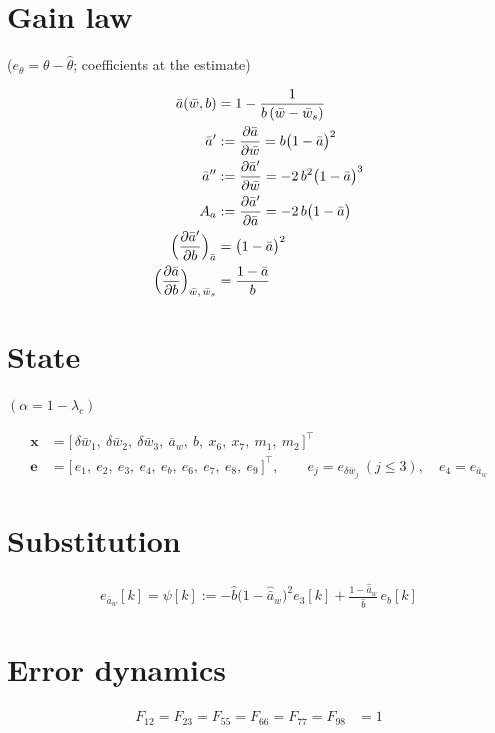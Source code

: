 \documentclass[11pt,a4paper,fontset=none]{ctexart}
\newcommand{\ba}{\bar{a}}
\newcommand{\bw}{\bar{w}}
\newcommand{\ap}{\ba'}
\newcommand{\app}{\ba''}
\newcommand{\ah}{\hat{\ba}_w}
\newcommand{\bh}{\hat{b}}
\newcommand{\ea}{e_{\ba_w}}
\begin{document}
\section{Gain law}

($e_\theta = \theta - \hat\theta$; coefficients at the estimate)

\begin{align*}
\ba(\bw, b) &= 1 - \frac{1}{b\,(\bw - \bw_s)} \\
\ap &:= \frac{\partial\ba}{\partial\bw} = b\bigl(1-\ba\bigr)^{2} \\
\app &:= \frac{\partial\ap}{\partial\bw} = -2\,b^{2}\bigl(1-\ba\bigr)^{3} \\
A_a &:= \frac{\partial\ap}{\partial\ba} = -2\,b\bigl(1-\ba\bigr) \\
\Bigl(\frac{\partial\ap}{\partial b}\Bigr)_{\ba} &= \bigl(1-\ba\bigr)^{2} \\
\Bigl(\frac{\partial\ba}{\partial b}\Bigr)_{\bw,\,\bw_s} &= \frac{1-\ba}{b}
\end{align*}

\section{State}

$(\alpha = 1-\lambda_c)$

\begin{align*}
\mathbf{x} &= \bigl[\,\delta\bw_1,\ \delta\bw_2,\ \delta\bw_3,\ \ba_w,\ b,\ x_6,\ x_7,\ m_1,\ m_2\,\bigr]^{\top} \\
\mathbf{e} &= \bigl[\,e_1,\ e_2,\ e_3,\ e_4,\ e_b,\ e_6,\ e_7,\ e_8,\ e_9\,\bigr]^{\top}, \qquad
e_j = e_{\delta\bw_j}\ (j \le 3), \quad e_4 = \ea
\end{align*}

\section{Substitution}

\begin{align*}
\ea[k] = \psi[k] := -\bh\bigl(1-\ah\bigr)^{2}e_3[k] + \frac{1-\ah}{\bh}\,e_b[k]
\end{align*}

\section{Error dynamics}

\begin{align*}
F_{12} = F_{23} = F_{55} = F_{66} = F_{77} = F_{98} &= 1
\end{align*}
\end{document}
